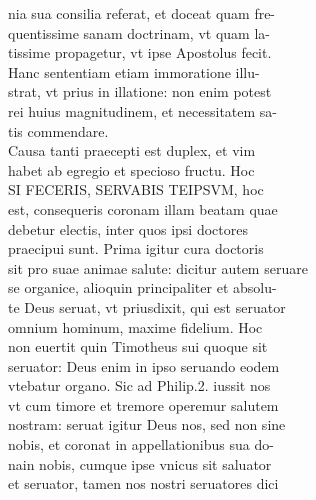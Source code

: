 \documentclass{article}
\begin{document}
\begin{pages}
                nia sua consilia referat, et doceat quam fre- \\
                quentissime sanam doctrinam, vt quam la- \\
                tissime propagetur, vt ipse Apostolus fecit. \\
                Hanc sententiam etiam immoratione illu- \\
                strat, vt prius in illatione: non enim potest \\
                rei huius magnitudinem, et necessitatem sa- \\
                tis commendare. \\
                Causa tanti praecepti est duplex, et vim \\
                habet ab egregio et specioso fructu. Hoc \\
                SI FECERIS, SERVABIS TEIPSVM, hoc \\
                est, consequeris coronam illam beatam quae \\
                debetur electis, inter quos ipsi doctores \\
                praecipui sunt. Prima igitur cura doctoris \\
                sit pro suae animae salute: dicitur autem seruare \\
                se organice, alioquin principaliter et absolu- \\
                te Deus seruat, vt priusdixit, qui est seruator \\
                omnium hominum, maxime fidelium. Hoc \\
                non euertit quin Timotheus sui quoque sit \\
                seruator: Deus enim in ipso seruando eodem \\
                vtebatur organo. Sic ad Philip.2. iussit nos \\
                vt cum timore et tremore operemur salutem \\
                nostram: seruat igitur Deus nos, sed non sine \\
                nobis, et coronat in appellationibus sua do- \\
                nain nobis, cumque ipse vnicus sit saluator \\
                et seruator, tamen nos nostri seruatores dici \\

\end{pages}
\end{document}
